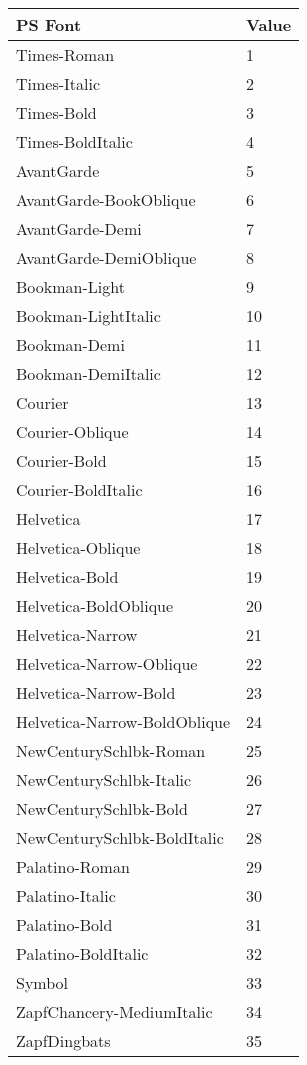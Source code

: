 \begin{center}
\begin{tabular}{|l|l|}
\hline
PS Font				& Value		\\ \hline
\hline
Times-Roman			& 1 		\\ \hline
Times-Italic			& 2 		\\ \hline
Times-Bold			& 3 		\\ \hline
Times-BoldItalic		& 4		\\ \hline
AvantGarde			& 5		\\ \hline
AvantGarde-BookOblique		& 6		\\ \hline
AvantGarde-Demi			& 7		\\ \hline
AvantGarde-DemiOblique		& 8		\\ \hline
Bookman-Light			& 9		\\ \hline
Bookman-LightItalic		& 10		\\ \hline
Bookman-Demi			& 11		\\ \hline
Bookman-DemiItalic		& 12		\\ \hline
Courier				& 13		\\ \hline	
Courier-Oblique			& 14		\\ \hline
Courier-Bold			& 15		\\ \hline
Courier-BoldItalic		& 16		\\ \hline
Helvetica			& 17		\\ \hline
Helvetica-Oblique		& 18		\\ \hline
Helvetica-Bold			& 19		\\ \hline
Helvetica-BoldOblique		& 20		\\ \hline
Helvetica-Narrow		& 21		\\ \hline
Helvetica-Narrow-Oblique	& 22		\\ \hline
Helvetica-Narrow-Bold		& 23		\\ \hline
Helvetica-Narrow-BoldOblique	& 24		\\ \hline
NewCenturySchlbk-Roman		& 25		\\ \hline
NewCenturySchlbk-Italic		& 26		\\ \hline
NewCenturySchlbk-Bold		& 27		\\ \hline
NewCenturySchlbk-BoldItalic	& 28		\\ \hline
Palatino-Roman			& 29		\\ \hline
Palatino-Italic			& 30		\\ \hline
Palatino-Bold			& 31		\\ \hline
Palatino-BoldItalic		& 32		\\ \hline
Symbol				& 33		\\ \hline
ZapfChancery-MediumItalic 	& 34		\\ \hline
ZapfDingbats			& 35		\\ \hline
\end{tabular}
\end{center}

